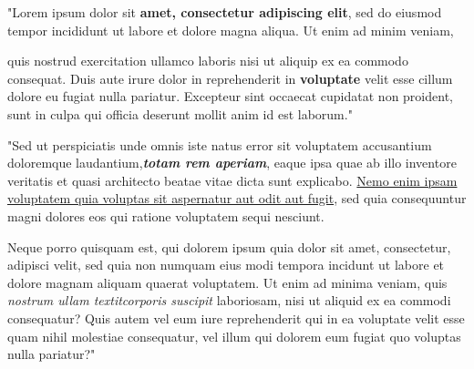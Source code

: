 \vspace{2.0mm}

\begin{flushleft}
\begingroup
\raggedleft
"Lorem ipsum dolor sit \textbf{amet, consectetur adipiscing elit}, sed do eiusmod tempor incididunt ut labore et dolore magna aliqua. Ut enim ad minim veniam,\par quis nostrud exercitation ullamco laboris nisi ut aliquip ex ea commodo consequat. Duis aute irure dolor in reprehenderit in \textbf{voluptate} velit esse cillum dolore eu fugiat nulla pariatur. Excepteur sint occaecat cupidatat non proident, sunt in culpa qui officia deserunt mollit anim id est laborum."

\endgroup

\vspace{0.5cm}

\begingroup
\raggedright
"Sed ut perspiciatis unde omnis iste natus error sit voluptatem accusantium doloremque laudantium,\textbf{\textit{totam rem aperiam}}, eaque ipsa quae ab illo inventore veritatis et quasi architecto beatae vitae dicta sunt explicabo. \underline{Nemo enim ipsam voluptatem quia voluptas sit aspernatur aut odit aut fugit}, sed quia consequuntur magni dolores eos qui ratione voluptatem sequi nesciunt.\par Neque porro quisquam est, qui dolorem ipsum quia dolor sit amet, consectetur, adipisci velit, sed quia non numquam eius modi tempora incidunt ut labore et dolore magnam aliquam quaerat voluptatem. Ut enim ad minima veniam, quis \textit{nostrum ullam \emph{textitcorporis} suscipit} laboriosam, nisi ut aliquid ex ea commodi consequatur? Quis autem vel eum iure reprehenderit qui in ea voluptate velit esse quam nihil molestiae consequatur, vel illum qui dolorem eum fugiat quo voluptas nulla pariatur?"

\endgroup
\end{flushleft}